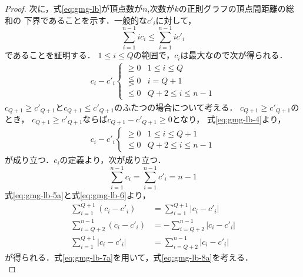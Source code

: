 \begin{proof}
  次に，式\ref{eq:gmg-lb}が頂点数が$n$,次数が$k$の正則グラフの頂点間距離の総和の
  下界であることを示す．一般的な$c'_i$に対して，
  \begin{equation}
    \label{eq:gmg-lb-3}
    \sum_{i=1}^{n-1}i c_i \leq \sum_{i=1}^{n-1}i c'_i
  \end{equation}
  であることを証明する．
  $1\leq i\leq Q$の範囲で，$c_i$は最大なので次が得られる．
  \begin{equation}
    \label{eq:gmg-lb-4}
    \begin{aligned}
      c_i - c'_i
      \begin{cases}
        \geq 0 & 1\leq i\leq Q \\
        \lesseqgtr 0 & i = Q+1 \\
        \leq 0 & Q+2\leq i\leq n-1
      \end{cases}
    \end{aligned}
  \end{equation}
  $c_{Q+1}\geq c'_{Q+1}$と$c_{Q+1}\leq c'_{Q+1}$のふたつの場合について考える．
  $c_{Q+1}\geq c'_{Q+1}$のとき，
  $c_{Q+1}\geq c'_{Q+1}$ならば$c_{Q+1}-c'_{Q+1}\geq0$となり，
  式\ref{eq:gmg-lb-4}より，
  \begin{equation}
    \label{eq:gmg-lb-5a}
    \begin{aligned}
      c_i-c'_i
      \begin{cases}
        \geq 0 & 1\leq i\leq Q+1 \\
        \leq 0 & Q+2\leq i\leq n-1
      \end{cases}
    \end{aligned}
  \end{equation}
  が成り立つ．$c_i$の定義より，次が成り立つ．
  \begin{equation}
    \label{eq:gmg-lb-6}
    \sum_{i=1}^{n-1}c_i = \sum_{i=1}^{n-1}c'_i = n-1
  \end{equation}
  式\ref{eq:gmg-lb-5a}と式\ref{eq:gmg-lb-6}より，
  \begin{equation}
    \label{eq:gmg-lb-7a}
    \begin{aligned}
      \sum_{i=1}^{Q+1}(c_i-c'_i) &= \sum_{i=1}^{Q+1}|c_i-c'_i| \\
      \sum_{i=Q+2}^{n-1}(c_i-c'_i) &= -\sum_{i=Q+2}^{n-1}|c_i-c'_i| \\
      \sum_{i=1}^{Q+1}|c_i-c'_i| &= \sum_{i=Q+2}^{n-1}|c_i-c'_i|
    \end{aligned}
  \end{equation}
  が得られる．式\ref{eq:gmg-lb-7a}を用いて，式\ref{eq:gmg-lb-8a}を考える．
  \begin{equation}

\end{equation}
\end{proof}
